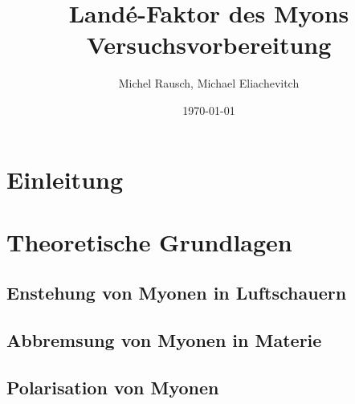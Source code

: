 \documentclass[a4paper,ngerman]{scrartcl}
\title{Landé-Faktor des Myons\\Versuchsvorbereitung}
\date{\today}
\author{Michel Rausch, Michael Eliachevitch}
\begin{document}
\maketitle
\tableofcontents
\newpage

\section{Einleitung}
\label{sec:einfuhrung}


\section{Theoretische Grundlagen}
\label{sec:theorie}

\subsection{Enstehung von Myonen in Luftschauern}
\label{sec:luftschauer}


\subsection{Abbremsung von Myonen in Materie}
\label{sec:wwmitmaterie}

\subsection{Polarisation von Myonen}
\label{sec:polarisation}
\end{document}
